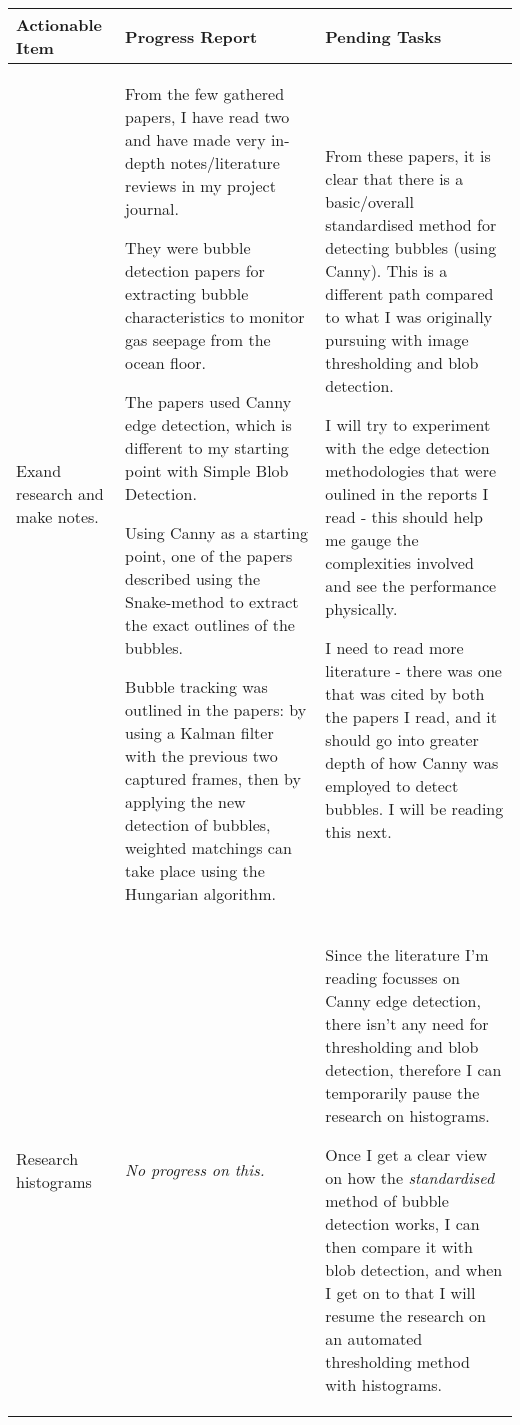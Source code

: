\begin{table}[!h]
    \centering
    \begin{tabularx}{\textwidth}{|X|X|X|}
        \hline
        Actionable Item & Progress Report & Pending Tasks \\
        \hline
        \hline
        Exand research and make notes. & 
        \begin{myitemize}
            \item From the few gathered papers, I have read two and have made very in-depth notes/literature reviews in my project journal.
            \item They were bubble detection papers for extracting bubble characteristics to monitor gas seepage from the ocean floor.
            \item The papers used Canny edge detection, which is different to my starting point with Simple Blob Detection.
            \item Using Canny as a starting point, one of the papers described using the Snake-method to extract the exact outlines of the bubbles.
            \item Bubble tracking was outlined in the papers: by using a Kalman filter with the previous two captured frames, then by applying the new detection of bubbles, weighted matchings can take place using the Hungarian algorithm.
        \end{myitemize} & 
        \begin{myitemize}
            \item From these papers, it is clear that there is a basic/overall standardised method for detecting bubbles (using Canny). This is a different path compared to what I was originally pursuing with image thresholding and blob detection.
            \item I will try to experiment with the edge detection methodologies that were oulined in the reports I read - this should help me gauge the complexities involved and see the performance physically.
            \item I need to read more literature - there was one that was cited by both the papers I read, and it should go into greater depth of how Canny was employed to detect bubbles. I will be reading this next.
        \end{myitemize} \\
        \hline
        Research histograms & 
        \textit{No progress on this.} & 
        \begin{myitemize}
            \item Since the literature I'm reading focusses on Canny edge detection, there isn't any need for thresholding and blob detection, therefore I can temporarily pause the research on histograms.
            \item Once I get a clear view on how the \textit{standardised} method of bubble detection works, I can then compare it with blob detection, and when I get on to that I will resume the research on an automated thresholding method with histograms.
        \end{myitemize} \\
        \hline
    \end{tabularx}
\end{table}

